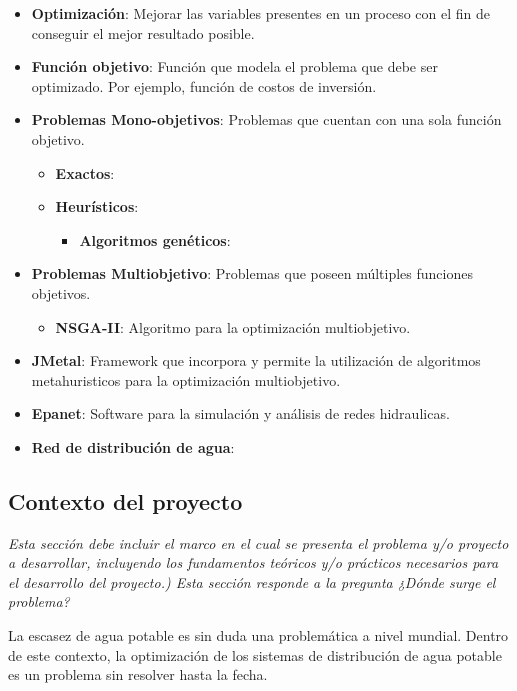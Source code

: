 \documentclass[11pt,letterpaper]{article}
\begin{document}
\begin{itemize}
\item \textbf{Optimización}: Mejorar las variables presentes en un proceso con el fin de conseguir el mejor resultado posible.
\item \textbf{Función objetivo}: Función que modela el problema que debe ser optimizado. Por ejemplo, función de costos de inversión.
\item \textbf{Problemas Mono-objetivos}: Problemas que cuentan con una sola función objetivo.
\begin{itemize}
	\item \textbf{Exactos}: 
	\item \textbf{Heurísticos}: 
	\begin{itemize}
		\item \textbf{Algoritmos genéticos}: 
	\end{itemize}
\end{itemize}
\item \textbf{Problemas Multiobjetivo}: Problemas que poseen múltiples funciones objetivos.
	\begin{itemize}
		\item \textbf{NSGA-II}: Algoritmo para la optimización multiobjetivo.
	\end{itemize}
\item \textbf{JMetal}: Framework que incorpora y permite la utilización de algoritmos metahuristicos para la optimización multiobjetivo. \cite{9}
\item \textbf{Epanet}: Software para la simulación y análisis de redes hidraulicas.
\item \textbf{Red de distribución de agua}:
 
\end{itemize}

\subsection{Contexto del proyecto} 
\emph{Esta sección debe incluir el marco en el cual se presenta el problema y/o proyecto a desarrollar, incluyendo los fundamentos teóricos y/o prácticos necesarios para el desarrollo del proyecto.) Esta sección responde a la pregunta ¿Dónde surge el problema?}

La escasez de agua potable es sin duda una problemática a nivel mundial. Dentro de este contexto, la optimización de los sistemas de distribución de agua potable es un problema sin resolver hasta la fecha. 
\end{document}
